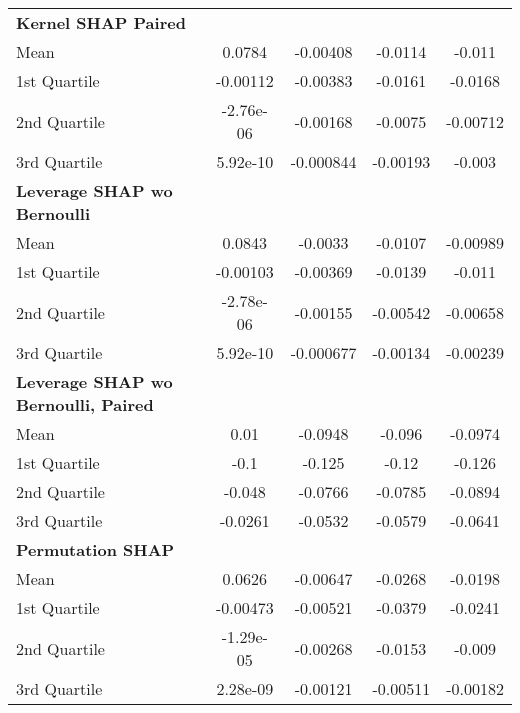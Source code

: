 {\begin{tabular} {lcccc}
\addlinespace[1ex] 
\textbf{Kernel SHAP Paired} &  &  &  &  \\ 
\hspace{7pt}Mean & 0.0784 & -0.00408 & -0.0114 & -0.011 \\ 
\hspace{7pt}1st Quartile & -0.00112 & -0.00383 & -0.0161 & -0.0168 \\ 
\hspace{7pt}2nd Quartile & -2.76e-06 & -0.00168 & -0.0075 & -0.00712 \\ 
\hspace{7pt}3rd Quartile & 5.92e-10 & -0.000844 & -0.00193 & -0.003 \\ 
\addlinespace[1ex] 
\textbf{Leverage SHAP wo Bernoulli} &  &  &  &  \\ 
\hspace{7pt}Mean & 0.0843 & -0.0033 & -0.0107 & -0.00989 \\ 
\hspace{7pt}1st Quartile & -0.00103 & -0.00369 & -0.0139 & -0.011 \\ 
\hspace{7pt}2nd Quartile & -2.78e-06 & -0.00155 & -0.00542 & -0.00658 \\ 
\hspace{7pt}3rd Quartile & 5.92e-10 & -0.000677 & -0.00134 & -0.00239 \\ 
\addlinespace[1ex] 
\textbf{Leverage SHAP wo Bernoulli, Paired} &  &  &  &  \\ 
\hspace{7pt}Mean & 0.01 & -0.0948 & -0.096 & -0.0974 \\ 
\hspace{7pt}1st Quartile & -0.1 & -0.125 & -0.12 & -0.126 \\ 
\hspace{7pt}2nd Quartile & -0.048 & -0.0766 & -0.0785 & -0.0894 \\ 
\hspace{7pt}3rd Quartile & -0.0261 & -0.0532 & -0.0579 & -0.0641 \\ 
\addlinespace[1ex] 
\textbf{Permutation SHAP} &  &  &  &  \\ 
\hspace{7pt}Mean & 0.0626 & -0.00647 & -0.0268 & -0.0198 \\ 
\hspace{7pt}1st Quartile & -0.00473 & -0.00521 & -0.0379 & -0.0241 \\ 
\hspace{7pt}2nd Quartile & -1.29e-05 & -0.00268 & -0.0153 & -0.009 \\ 
\hspace{7pt}3rd Quartile & 2.28e-09 & -0.00121 & -0.00511 & -0.00182 \\ 
\bottomrule
\end{tabular}}
